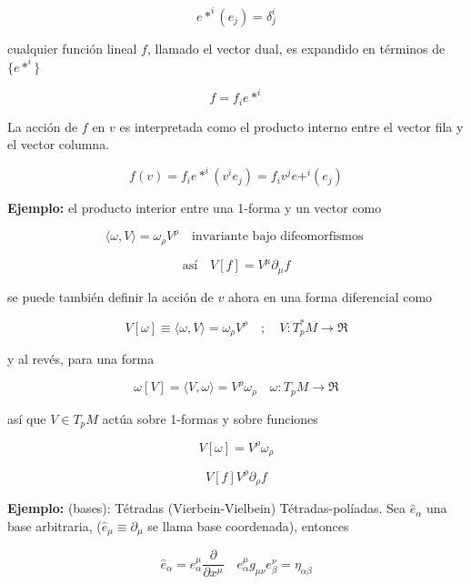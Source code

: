 \documentclass{report}
\begin{document}
\begin{equation}
e*^{i}(e_{j}) = \delta _{j} ^{i}
\end{equation}

cualquier función lineal $f$, llamado el vector dual, es expandido en términos de $\lbrace e*^{i} \rbrace$

\begin{equation}
f = f_{i} e*^{i}
\end{equation}

La acción de $f$ en $v$ es interpretada como el producto interno entre el vector fila y el vector columna.

\begin{equation}
f(v) = f_{i}e*^{i}(v^{i}e_{j})=f_{i}v^{j}e+^{i}(e_{j})
\end{equation}


\textbf{Ejemplo:} el producto interior entre una 1-forma y un vector como 

\[ \langle \omega , V \rangle = \omega _{\rho } V^{\rho} \quad \text{invariante bajo difeomorfismos }\]

\[\text{así} \quad V[f]= V^{\mu}\partial_{\mu} f\]

se puede también definir la acción de $v$ ahora en una forma diferencial como

\[V[\omega ]\equiv \langle\omega , V \rangle = \omega_{\rho} V^{\rho} \quad ; \quad V: T_{p}^{*} M \rightarrow\mathfrak{R} \]

y al revés, para una forma 

\[\omega [V] = \langle V , \omega \rangle = V ^{\rho}\omega _{\rho} \quad \omega : T_{p}M \rightarrow \mathfrak{R}\]

así que $V \in T_{p}M$ actúa sobre 1-formas y sobre funciones

\[V[\omega] = V^{\rho} \omega _{\rho }\]

\[V [f] V^{\rho} \partial_{\rho}f \]

\textbf{Ejemplo:} (bases): Tétradas (Vierbein-Vielbein) Tétradas-políadas. Sea $\hat{e}_{\alpha}$ una base arbitraria, ($\hat{e}_{\mu}\equiv \partial_\mu $ se llama base coordenada), entonces

\begin{equation}
\hat{e}_{\alpha} =e_{\alpha} ^{\mu} \frac{\partial}{\partial x^{\mu}} \quad e_{\alpha}^{\mu} g_{\mu \nu} e_{\beta}^{\nu} = \eta _{\alpha \beta}
\end{equation}
\end{document}
